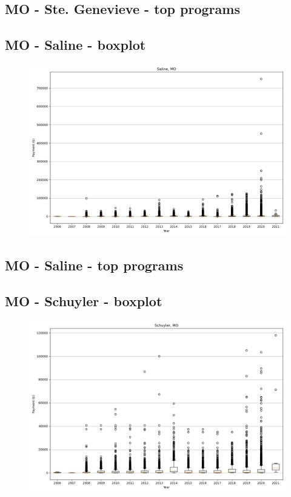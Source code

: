 \subsection*{MO - Ste. Genevieve - top programs}

\newpage
\subsection*{MO - Saline - boxplot}
\begin{figure}[h]
\centering
\includegraphics[width=7in]{../output/boxplots/counties/Saline-MO_boxplot.png}
\end{figure}


\subsection*{MO - Saline - top programs}

\newpage
\subsection*{MO - Schuyler - boxplot}
\begin{figure}[h]
\centering
\includegraphics[width=7in]{../output/boxplots/counties/Schuyler-MO_boxplot.png}
\end{figure}


